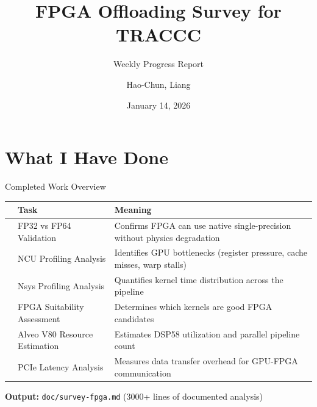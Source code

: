 \documentclass[aspectratio=169, table]{beamer}
\title{FPGA Offloading Survey for TRACCC}
\subtitle{Weekly Progress Report}
\author{Hao-Chun, Liang}
\institute{Master's Thesis Progress Report}
\date{January 14, 2026}
\newcommand{\cmark}{\textcolor{acadgreen}{\ding{51}}}
\begin{document}
\begin{frame}
\titlepage
\vspace{-1em}
\end{frame}

\section{What I Have Done}

\begin{frame}{Completed Work Overview}
\begin{table}
\begin{tabular}{clp{7cm}}
    \toprule
    & \textbf{Task} & \textbf{Meaning} \\
    \midrule
    \cmark & FP32 vs FP64 Validation & Confirms FPGA can use native single-precision without physics degradation \\
    \cmark & NCU Profiling Analysis & Identifies GPU bottlenecks (register pressure, cache misses, warp stalls) \\
    \cmark & Nsys Profiling Analysis & Quantifies kernel time distribution across the pipeline \\
    \cmark & FPGA Suitability Assessment & Determines which kernels are good FPGA candidates \\
    \cmark & Alveo V80 Resource Estimation & Estimates DSP58 utilization and parallel pipeline count \\
    \cmark & PCIe Latency Analysis & Measures data transfer overhead for GPU-FPGA communication \\
    \bottomrule
\end{tabular}
\end{table}

\vspace{0.5em}
\centering
\textbf{Output:} \texttt{doc/survey-fpga.md} (3000+ lines of documented analysis)
\end{frame}
\end{document}
